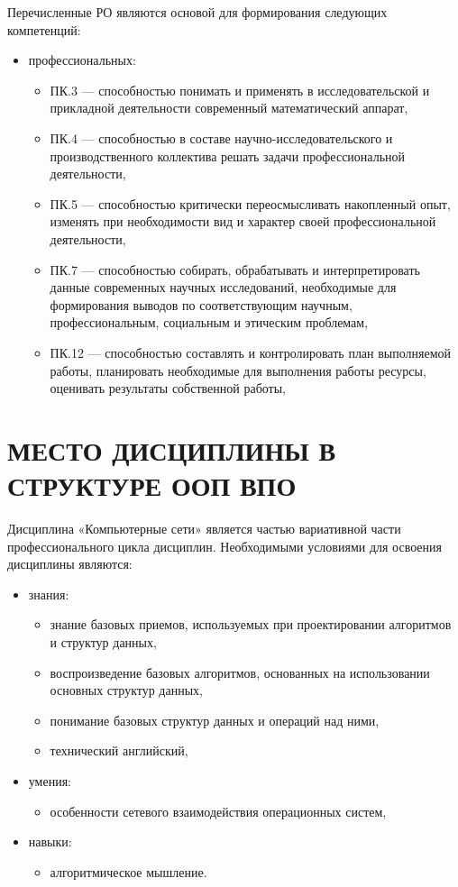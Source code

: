 \begin{center}
{Перечисленные РО являются основой для формирования следующих компетенций:
\begin{itemize}
\item профессиональных: \begin{itemize}
\item ПК.3 — способностью понимать и применять в исследовательской и прикладной деятельности современный математический аппарат,\item ПК.4 — способностью в составе научно-исследовательского и производственного коллектива решать задачи профессиональной деятельности,\item ПК.5 — способностью критически переосмысливать накопленный опыт, изменять при необходимости вид и характер своей профессиональной деятельности,\item ПК.7 — способностью собирать, обрабатывать и интерпретировать данные современных научных исследований, необходимые для формирования выводов по соответствующим научным, профессиональным, социальным и этическим проблемам,\item ПК.12 — способностью составлять и контролировать план выполняемой работы, планировать необходимые для выполнения работы ресурсы, оценивать результаты собственной работы,
\end{itemize}
\end{itemize}
}

\newpage
\section{МЕСТО ДИСЦИПЛИНЫ В СТРУКТУРЕ ООП ВПО}
Дисциплина «Компьютерные сети» является частью вариативной части профессионального цикла дисциплин.
Необходимыми условиями для освоения дисциплины являются:
\begin{itemize}
\item знания:
\begin{itemize}
\item знание базовых приемов, используемых при проектировании алгоритмов и структур данных,\item воспроизведение базовых алгоритмов, основанных на использовании основных структур данных,\item понимание базовых структур данных и операций над ними,\item технический английский,
\end{itemize}
\item умения:
\begin{itemize}
\item особенности сетевого взаимодействия операционных систем,
\end{itemize}
\item навыки:
\begin{itemize}
\item алгоритмическое мышление.
\end{itemize}
\end{itemize}



\end{center}
